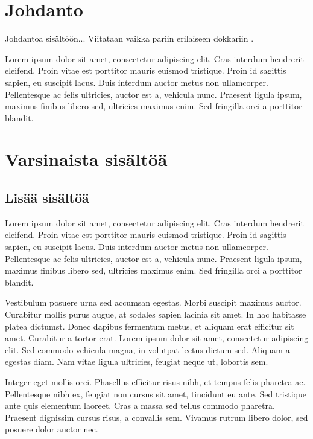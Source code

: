 \section{Johdanto}

Johdantoa sisältöön...
Viitataan vaikka pariin \parencite{vahakainu_et_al} erilaiseen \parencite{maenpaa_peltola} dokkariin \parencite{wahle_et_al}.

Lorem ipsum dolor sit amet, consectetur adipiscing elit. Cras interdum hendrerit eleifend. Proin vitae est porttitor mauris euismod tristique. Proin id sagittis sapien, eu suscipit lacus. Duis interdum auctor metus non ullamcorper. Pellentesque ac felis ultricies, auctor est a, vehicula nunc. Praesent ligula ipsum, maximus finibus libero sed, ultricies maximus enim. Sed fringilla orci a porttitor blandit.

\section{Varsinaista sisältöä}

\subsection{Lisää sisältöä}

Lorem ipsum dolor sit amet, consectetur adipiscing elit. Cras interdum hendrerit eleifend. Proin vitae est porttitor mauris euismod tristique. Proin id sagittis sapien, eu suscipit lacus. Duis interdum auctor metus non ullamcorper. Pellentesque ac felis ultricies, auctor est a, vehicula nunc. Praesent ligula ipsum, maximus finibus libero sed, ultricies maximus enim. Sed fringilla orci a porttitor blandit.

Vestibulum posuere urna sed accumsan egestas. Morbi suscipit maximus auctor. Curabitur mollis purus augue, at sodales sapien lacinia sit amet. In hac habitasse platea dictumst. Donec dapibus fermentum metus, et aliquam erat efficitur sit amet. Curabitur a tortor erat. Lorem ipsum dolor sit amet, consectetur adipiscing elit. Sed commodo vehicula magna, in volutpat lectus dictum sed. Aliquam a egestas diam. Nam vitae ligula ultricies, feugiat neque ut, lobortis sem.

Integer eget mollis orci. Phasellus efficitur risus nibh, et tempus felis pharetra ac. Pellentesque nibh ex, feugiat non cursus sit amet, tincidunt eu ante. Sed tristique ante quis elementum laoreet. Cras a massa sed tellus commodo pharetra. Praesent dignissim cursus risus, a convallis sem. Vivamus rutrum libero dolor, sed posuere dolor auctor nec.

